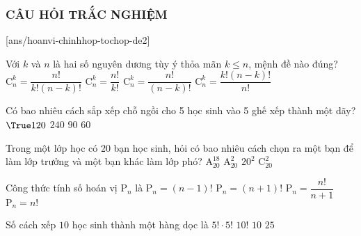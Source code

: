 \subsubsection{CÂU HỎI TRẮC NGHIỆM}
[ans/hoanvi-chinhhop-tochop-de2]
\begin{ex}%
	Với $k$ và $n$ là hai số nguyên dương tùy ý thỏa mãn $k \leq n$, mệnh đề nào đúng?
	\choice
	{\True $\mathrm{C}_{n}^{k}=\dfrac{n !}{k !(n-k) !}$}
	{ $\mathrm{C}_{n}^{k}=\dfrac{n !}{k !}$}
	{ $\mathrm{C}_{n}^{k}=\dfrac{n !}{(n-k) !}$}
	{ $\mathrm{C}_{n}^{k}=\dfrac{k !(n-k) !}{n !}$}
\end{ex} 
\begin{ex}%
	Có bao nhiêu cách sắp xếp chỗ ngồi cho 5 học sinh vào 5 ghế xếp thành một dãy?
	\choice
	{$\True 120$}
	{$240$}
	{$ 90$}
	{ $60$}
\end{ex}
\begin{ex}%
	Trong một lớp học có 20 bạn học sinh, hỏi có bao nhiêu cách chọn ra một bạn để làm lớp trưởng và một bạn khác làm lớp phó?
	\choice
	{$\mathrm{A}_{20}^{18}$}
	{\True $\mathrm{A}_{20}^{2}$}
	{ $20^{2}$}
	{ $\mathrm{C}_{20}^{2}$}
\end{ex}
\begin{ex}%
	Công thức tính số hoán vị $\mathrm{P}_n$ là
	\choice
	{ $\mathrm{P}_n=\left( n-1 \right)!$}
	{ $\mathrm{P}_n=\left( n+1 \right)!$}
	{ $\mathrm{P}_n=\dfrac{n!}{n+1}$}
	{\True $\mathrm{P}_n=n!$}
\end{ex}
\begin{ex}%
	Số cách xếp $10$ học sinh thành một hàng dọc là
	\choice
	{ $5!\cdot5!$}
	{\True $10!$}
	{ $10$}
	{ $25$}
\end{ex}
